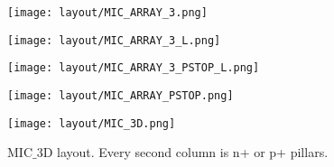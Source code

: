 \documentclass[../main/thesis.tex]{subfiles}
\begin{document}
\begin{figure}
	\centering
	\begin{minipage}{.5\textwidth}
		\centering
		\texttt{[image: layout/MIC\_ARRAY\_3.png]}
		\label{fig-mic-array-3}
	\end{minipage}%
	\begin{minipage}{.5\textwidth}
		\centering
		\texttt{[image: layout/MIC\_ARRAY\_3\_L.png]}
		\label{fig-mic-array-3-L}
	\end{minipage}
\end{figure}

\begin{figure}
	\centering
	\begin{minipage}{.5\textwidth}
		\centering
		\texttt{[image: layout/MIC\_ARRAY\_3\_PSTOP\_L.png]}
		\label{fig-mic-array-3-pstop-L}
	\end{minipage}%
	\begin{minipage}{.5\textwidth}
		\centering
		\texttt{[image: layout/MIC\_ARRAY\_PSTOP.png]}
		\label{fig-mic-array-pstop}
	\end{minipage}
\end{figure}

\begin{figure}%
	\centering
	\texttt{[image: layout/MIC\_3D.png]}
	\caption{MIC$\_$3D layout. Every second column is n+ or p+ pillars.}
	\label{fig-mic-3D} 
\end{figure}
\end{document}
